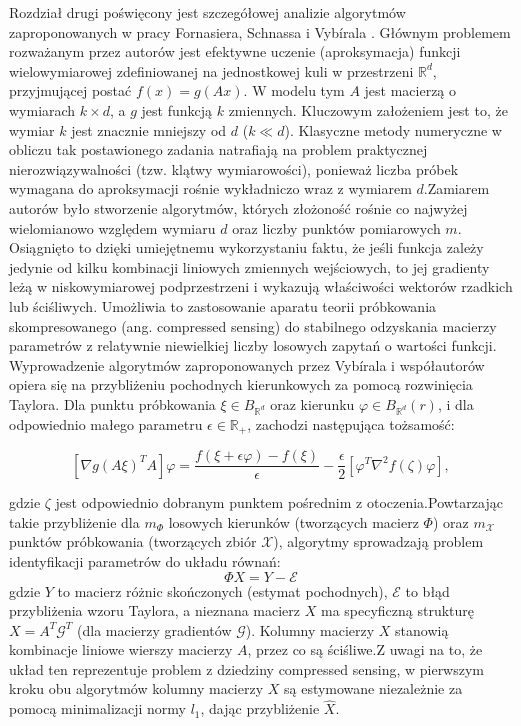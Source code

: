 Rozdział drugi poświęcony jest szczegółowej analizie algorytmów zaproponowanych w pracy Fornasiera, Schnassa i Vybírala \cite{fornasier2012learning}. Głównym problemem rozważanym przez autorów jest efektywne uczenie (aproksymacja) funkcji wielowymiarowej zdefiniowanej na jednostkowej kuli w przestrzeni $\mathbb{R}^d$, przyjmującej postać $f(x)=g(Ax)$. W modelu tym $A$ jest macierzą o wymiarach $k \times d$, a $g$ jest funkcją $k$ zmiennych. Kluczowym założeniem jest to, że wymiar $k$ jest znacznie mniejszy od $d$ ($k \ll d$). Klasyczne metody numeryczne w obliczu tak postawionego zadania natrafiają na problem praktycznej nierozwiązywalności (tzw. klątwy wymiarowości), ponieważ liczba próbek wymagana do aproksymacji rośnie wykładniczo wraz z wymiarem $d$.Zamiarem autorów było stworzenie algorytmów, których złożoność rośnie co najwyżej wielomianowo względem wymiaru $d$ oraz liczby punktów pomiarowych $m$. Osiągnięto to dzięki umiejętnemu wykorzystaniu faktu, że jeśli funkcja zależy jedynie od kilku kombinacji liniowych zmiennych wejściowych, to jej gradienty leżą w niskowymiarowej podprzestrzeni i wykazują właściwości wektorów rzadkich lub ściśliwych. Umożliwia to zastosowanie aparatu teorii próbkowania skompresowanego (ang. compressed sensing) do stabilnego odzyskania macierzy parametrów z relatywnie niewielkiej liczby losowych zapytań o wartości funkcji. Wyprowadzenie algorytmów zaproponowanych przez Vybírala i współautorów opiera się na przybliżeniu pochodnych kierunkowych za pomocą rozwinięcia Taylora. Dla punktu próbkowania $\xi \in B_{\mathbb{R}^d}$ oraz kierunku $\varphi \in B_{\mathbb{R}^d}(r)$, i dla odpowiednio małego parametru $\epsilon \in \mathbb{R}_+$, zachodzi następująca tożsamość:


$$[\nabla g(A\xi)^T A]\varphi = \frac{f(\xi+\epsilon\varphi)-f(\xi)}{\epsilon} - \frac{\epsilon}{2}[\varphi^T \nabla^2 f(\zeta) \varphi],$$

gdzie $\zeta$ jest odpowiednio dobranym punktem pośrednim z otoczenia.Powtarzając takie przybliżenie dla $m_\Phi$ losowych kierunków (tworzących macierz $\Phi$) oraz $m_\mathcal{X}$ punktów próbkowania (tworzących zbiór $\mathcal{X}$), algorytmy sprowadzają problem identyfikacji parametrów do układu równań:$$\Phi X = Y - \mathcal{E}$$gdzie $Y$ to macierz różnic skończonych (estymat pochodnych), $\mathcal{E}$ to błąd przybliżenia wzoru Taylora, a nieznana macierz $X$ ma specyficzną strukturę $X = A^T \mathcal{G}^T$ (dla macierzy gradientów $\mathcal{G}$). Kolumny macierzy $X$ stanowią kombinacje liniowe wierszy macierzy $A$, przez co są ściśliwe.Z uwagi na to, że układ ten reprezentuje problem z dziedziny compressed sensing, w pierwszym kroku obu algorytmów kolumny macierzy $X$ są estymowane niezależnie za pomocą minimalizacji normy $l_1$, dając przybliżenie $\hat{X}.$

